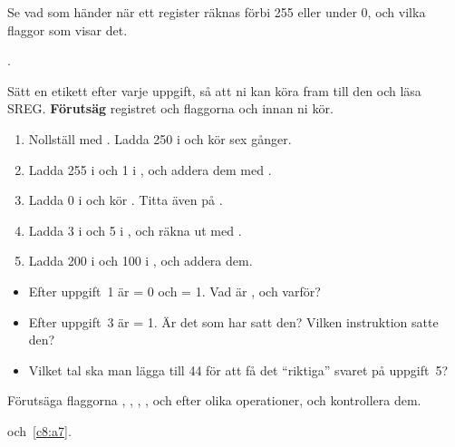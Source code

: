 
\label{lab3:d9}
Se vad som händer när ett register räknas förbi 255 eller under 0, och vilka flaggor som visar
det.

.

Sätt en etikett efter varje uppgift, så att ni kan köra fram till den och läsa SREG.
\textbf{Förutsäg} registret och flaggorna  och  innan ni kör.
\begin{enumerate}
  \item Nollställ  med . Ladda 250 i  och kör  sex
    gånger.
  \item Ladda 255 i  och 1 i , och addera dem med .
  \item Ladda 0 i  och kör . Titta även på .
  \item Ladda 3 i  och 5 i , och räkna ut  med .
  \item Ladda 200 i  och 100 i , och addera dem.
\end{enumerate}

\begin{itemize}
  \item Efter uppgift~1 är  = 0 och  = 1. Vad är , och varför?
  \item Efter uppgift~3 är  = 1. Är det  som har satt den? Vilken instruktion
    satte den?
  \item Vilket tal ska man lägga till 44 för att få det \enquote{riktiga} svaret på uppgift~5?
\end{itemize}


\label{lab3:d10}
Förutsäga flaggorna , , , ,  och  efter olika
operationer, och kontrollera dem.

 och~\ref{c8:a7}.

